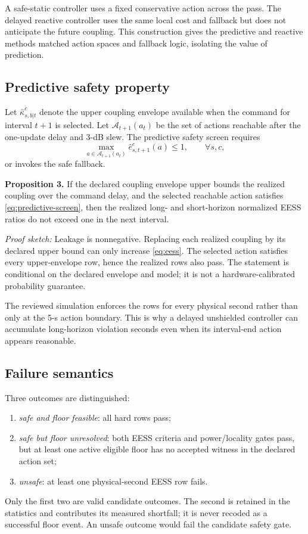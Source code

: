 \documentclass[journal]{IEEEtran}
\begin{document}
A safe-static controller uses a fixed conservative action across the pass. The delayed reactive controller uses the same local cost and fallback but does not anticipate the future coupling. This construction gives the predictive and reactive methods matched action spaces and fallback logic, isolating the value of prediction.


\subsection{Predictive safety property}
Let $\widehat\kappa^{c}_{s,b|t}$ denote the upper coupling envelope available when the command for interval $t+1$ is selected. Let $\mathcal{A}_{t+1}(a_t)$ be the set of actions reachable after the one-update delay and 3-dB slew. The predictive safety screen requires
\begin{equation}
 \max_{a\in\mathcal{A}_{t+1}(a_t)}
 \widehat e^{c}_{s,t+1}(a)\le 1,
 \qquad \forall s,c,
 \label{eq:predictive-screen}
\end{equation}
or invokes the safe fallback.

\textbf{Proposition 3.} If the declared coupling envelope upper bounds the realized coupling over the command delay, and the selected reachable action satisfies \eqref{eq:predictive-screen}, then the realized long- and short-horizon normalized EESS ratios do not exceed one in the next interval.

\emph{Proof sketch:} Leakage is nonnegative. Replacing each realized coupling by its declared upper bound can only increase \eqref{eq:eess}. The selected action satisfies every upper-envelope row, hence the realized rows also pass. The statement is conditional on the declared envelope and model; it is not a hardware-calibrated probability guarantee.

The reviewed simulation enforces the rows for every physical second rather than only at the 5-s action boundary. This is why a delayed unshielded controller can accumulate long-horizon violation seconds even when its interval-end action appears reasonable.

\subsection{Failure semantics}
Three outcomes are distinguished:
\begin{enumerate}
\item \emph{safe and floor feasible}: all hard rows pass;
\item \emph{safe but floor unresolved}: both EESS criteria and power/locality gates pass, but at least one active eligible floor has no accepted witness in the declared action set;
\item \emph{unsafe}: at least one physical-second EESS row fails.
\end{enumerate}
Only the first two are valid candidate outcomes. The second is retained in the statistics and contributes its measured shortfall; it is never recoded as a successful floor event. An unsafe outcome would fail the candidate safety gate.
\end{document}
